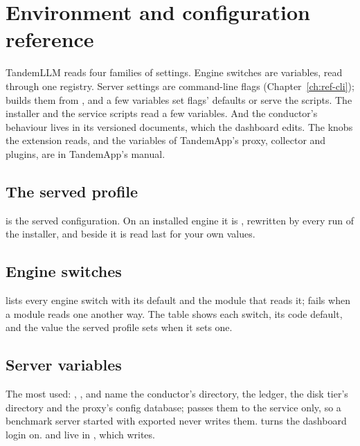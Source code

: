 \chapter{Environment and configuration reference}\label{ch:ref-env}

TandemLLM reads four families of settings. Engine switches are  variables, read through one registry. Server settings are command-line flags (Chapter~\ref{ch:ref-cli});  builds them from , and a few  variables set flags' defaults or serve the scripts. The installer and the service scripts read a few  variables. And the conductor's behaviour lives in its versioned documents, which the dashboard edits. The  knobs the extension reads, and the variables of TandemApp's proxy, collector and plugins, are in TandemApp's manual.

\section{The served profile}

 is the served configuration. On an installed engine it is , rewritten by every run of the installer, and  beside it is read last for your own values.



\section{Engine switches}

 lists every engine switch with its default and the module that reads it;  fails when a module reads one another way. The table shows each switch, its code default, and the value the served profile sets when it sets one.



\section{Server variables}



The most used: , ,  and  name the conductor's directory, the ledger, the disk tier's directory and the proxy's config database;  passes them to the service only, so a benchmark server started with  exported never writes them.  turns the dashboard login on.  and  live in , which  writes.

